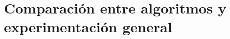 \documentclass[a4paper, 10pt, twoside]{article}
\begin{document}
\newpage



\section{Comparación entre algoritmos y experimentación general}
\label{sec:experimentacion-general}


\newpage
\end{document}
